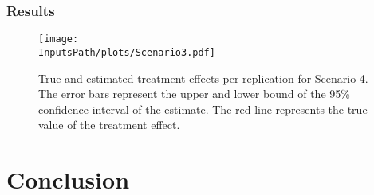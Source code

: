\documentclass[10pt]{article}
\newcommand*{\InputsFolderPath}{C:/DEV/DML/src/data/}
\newcommand*{\InputsPath}{\InputsFolderPath/20221107}
\begin{document}
\subsubsection{Results}
\begin{figure}[H]
	\begin{center}
		\texttt{[image: \\InputsPath/plots/Scenario3.pdf]}
		\caption{True and estimated treatment effects per replication for Scenario 4. The error bars represent the upper and lower bound of the 95\% confidence interval of the estimate. The red line represents the true value of the treatment effect.}
		\label{Scenario 4}
	\end{center}
\end{figure}


\section{Conclusion}


	
\end{document}
